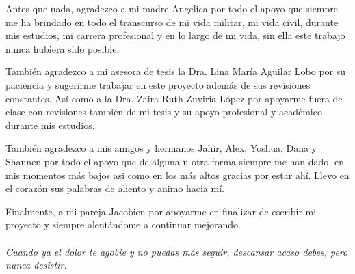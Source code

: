
Antes que nada, agradezco a mi madre Angelica por todo el apoyo que siempre me ha brindado en todo
el transcurso de mi vida militar, mi vida civil, durante mis estudios, mi carrera profesional y en
lo largo de mi vida, sin ella este trabajo nunca hubiera sido posible.

También agradezco a mi asesora de tesis la Dra. Lina María Aguilar Lobo por su paciencia y sugerirme trabajar
en este proyecto además de sus revisiones constantes.
Así como a la Dra. Zaira Ruth Zuviria López por apoyarme fuera de clase con revisiones también de mi tesis y
su apoyo profesional y académico durante mis estudios. 

También agradezco a mis amigos y hermanos Jahir, Alex, Yoshua, Dana y Shannen por todo el apoyo que
de alguna u otra forma siempre me han dado, en mis momentos más bajos asi como en los más altos
gracias por estar ahí. Llevo en el corazón sus palabras de aliento y animo hacia mí.

Finalmente, a mi pareja Jacobien por apoyarme en finalizar de escribir mi proyecto y siempre alentándome a continuar mejorando.
\\
\\
\emph{Cuando ya el dolor te agobie y no puedas más seguir, descansar acaso debes, pero nunca desistir.}
